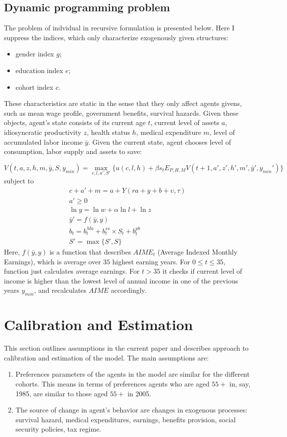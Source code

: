\documentclass[
10pt, %
a4paper, %
oneside, %
headinclude,footinclude, %
BCOR5mm, %
]{scrartcl}
\begin{document}
\subsection{Dynamic programming problem}
The problem of indvidual in recursive formulation is presented below. Here I suppress the indices, which only characterize exogenously given structures:
\begin{itemize}
\item gender index $g$;
\item education index $e$;
\item cohort index $c$.
\end{itemize}
These characteristics are static in the sense that they only affect agents givens, such as mean wage profile, government benefits, survival hazards. Given these objects, agent's state consists of its current age $t$, current level of assets $a$, idiosyncratic productivity $z$, health status $h$, medical expenditure $m$, level of accumulated labor income $\bar{y}$. Given the current state, agent chooses level of consumption, labor supply and assets to save:

\begin{equation}
V(t,a,z,h,m,\bar{y},S,y_{min}) = \max_{c,l,a',S'}\{u(c,l,h) + \beta s_t  E_{P,H,M} V(t+1,a',z',h',m',\bar{y}',y_{min}')\}
\end{equation}
subject to 
\begin{eqnarray*}
c + a' +m = a+Y(ra+y+b+\upsilon,\tau) \\
a'\ge0 \\
\ln y = \ln w+\alpha \ln l + \ln z \\
\bar{y}' = f(\bar{y},y)\\
b_t = b_t^{Ma} + b_t^{ss}\times S_t+b_t^{pb} \\
S' = \max\{S',S\}
\end{eqnarray*}
Here, $f(\bar{y},y)$ is a function that describes $AIME_t$ (Average Indexed Monthly Earnings), which is average over $35$ highest earning years. For $0\le t \le 35$, function just calculates average earnings. For $t>35$ it checks if current level of income is higher than the lowest level of annual income in one of the previous years $y_{min}$, and recalculates $AIME$ accordingly.  

\section{Calibration and Estimation}
This section outlines assumptions in the current paper and describes approach to calibration and estimation of the model.
The main assumptions are:
\begin{enumerate}
\item Preferences parameters of the agents in the model are similar for the different cohorts. This means in terms of preferences agents who are aged $55+$ in, say, 1985, are similar to those aged $55+$ in 2005.
\item The source of change in agent's behavior are changes in exogenous processes: survival hazard, medical expenditures, earnings, benefits provision, social security policies, tax regime.
\end{enumerate}
\end{document}
